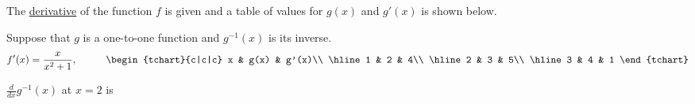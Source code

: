 \documentclass{ximera}
\author{Gregory Hartman \and Matthew Carr}
\begin{document}
\begin{exercise}



The \underline{derivative} of the function $f$ is given and a table of values for $g(x)$ and $g'(x)$ is shown below.

Suppose that $g$ is a one-to-one function and $g^{-1}(x)$ is its inverse.
\[
f'(x)=\frac{x}{x^2+1},\hskip 1cm
\begin{tchart}{c|c|c}
x & g(x) & g'(x)\\ \hline
1 & 2 & 4\\ \hline
2 & 3 & 5\\ \hline
3 & 4 & 1
\end{tchart}
\]

$\frac{d}{dx}g^{-1}(x)$ at $x=2$ is
\begin{prompt}
\begin{multipleChoice}
\end{multipleChoice}
\end{prompt}

\end{exercise}
\end{document}
